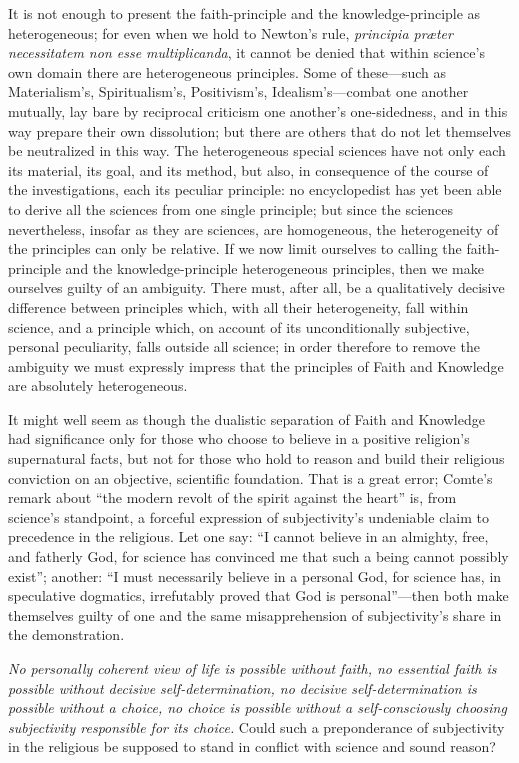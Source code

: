 \documentclass[12pt]{article}
\begin{document}
It is not enough to present the faith-principle and the knowledge-principle as
heterogeneous; for even when we hold to Newton's rule, \textit{principia
præter necessitatem non esse multiplicanda}, it cannot be denied that within
science's own domain there are heterogeneous principles. Some of these—such as
Materialism's, Spiritualism's, Positivism's, Idealism's—combat one another
mutually, lay bare by reciprocal criticism one another's one-sidedness, and in
this way prepare their own dissolution; but there are others that do not let
themselves be neutralized in this way. The heterogeneous special sciences have
not only each its material, its goal, and its method, but also, in consequence
of the course of the investigations, each its peculiar principle: no
encyclopedist has yet been able to derive all the sciences from one single
principle; but since the sciences nevertheless, insofar as they are sciences,
are homogeneous, the heterogeneity of the principles can only be relative. If
we now limit ourselves to calling the faith-principle and the
knowledge-principle heterogeneous principles, then we make ourselves guilty of
an ambiguity. There must, after all, be a qualitatively decisive difference
between principles which, with all their heterogeneity, fall within science,
and a principle which, on account of its unconditionally subjective, personal
peculiarity, falls outside
all science; in order therefore to remove the ambiguity we must expressly
impress that the principles of Faith and Knowledge are absolutely
heterogeneous.

It might well seem as though the dualistic separation of Faith and Knowledge
had significance only for those who choose to believe in a positive religion's
supernatural facts, but not for those who hold to reason and build their
religious conviction on an objective, scientific foundation. That is a great
error; Comte's remark about ``the modern revolt of the spirit against the
heart'' is, from science's standpoint, a forceful expression of subjectivity's
undeniable claim to precedence in the religious. Let one say: ``I cannot
believe in an almighty, free, and fatherly God, for science has convinced me
that such a being cannot possibly exist''; another: ``I must necessarily
believe in a personal God, for science has, in speculative dogmatics,
irrefutably proved that God is personal''—then both make themselves guilty of
one and the same misapprehension of subjectivity's share in the demonstration.

\emph{No personally coherent view of life is possible without faith, no
essential faith is possible without decisive self-determination, no decisive
self-determination is possible without a choice, no choice is possible without
a self-consciously choosing subjectivity responsible for its choice.} Could
such a preponderance of subjectivity in the religious be supposed to stand in
conflict with science and sound reason?
\end{document}

